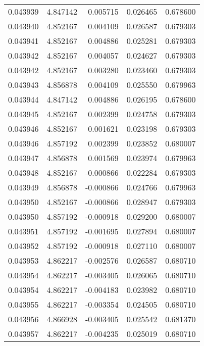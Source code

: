 \begin{tabular}{lrrrr}
0.043939    &  4.847142 &  0.005715 &  0.026465 &             0.678600 \\
0.043940    &  4.852167 &  0.004109 &  0.026587 &             0.679303 \\
0.043941    &  4.852167 &  0.004886 &  0.025281 &             0.679303 \\
0.043942    &  4.852167 &  0.004057 &  0.024627 &             0.679303 \\
0.043942    &  4.852167 &  0.003280 &  0.023460 &             0.679303 \\
0.043943    &  4.856878 &  0.004109 &  0.025550 &             0.679963 \\
0.043944    &  4.847142 &  0.004886 &  0.026195 &             0.678600 \\
0.043945    &  4.852167 &  0.002399 &  0.024758 &             0.679303 \\
0.043946    &  4.852167 &  0.001621 &  0.023198 &             0.679303 \\
0.043946    &  4.857192 &  0.002399 &  0.023852 &             0.680007 \\
0.043947    &  4.856878 &  0.001569 &  0.023974 &             0.679963 \\
0.043948    &  4.852167 & -0.000866 &  0.022284 &             0.679303 \\
0.043949    &  4.856878 & -0.000866 &  0.024766 &             0.679963 \\
0.043950    &  4.852167 & -0.000866 &  0.028947 &             0.679303 \\
0.043950    &  4.857192 & -0.000918 &  0.029200 &             0.680007 \\
0.043951    &  4.857192 & -0.001695 &  0.027894 &             0.680007 \\
0.043952    &  4.857192 & -0.000918 &  0.027110 &             0.680007 \\
0.043953    &  4.862217 & -0.002576 &  0.026587 &             0.680710 \\
0.043954    &  4.862217 & -0.003405 &  0.026065 &             0.680710 \\
0.043954    &  4.862217 & -0.004183 &  0.023982 &             0.680710 \\
0.043955    &  4.862217 & -0.003354 &  0.024505 &             0.680710 \\
0.043956    &  4.866928 & -0.003405 &  0.025542 &             0.681370 \\
0.043957    &  4.862217 & -0.004235 &  0.025019 &             0.680710 \\

\end{tabular}
